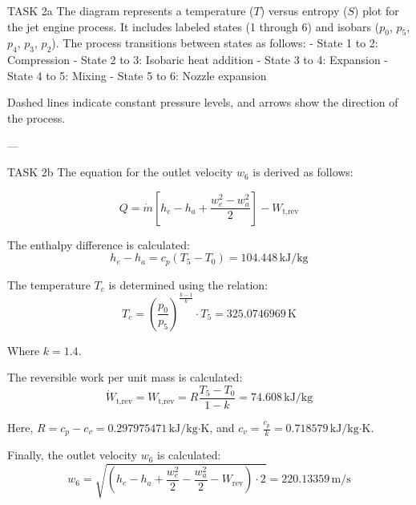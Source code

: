 TASK 2a  
The diagram represents a temperature (\(T\)) versus entropy (\(S\)) plot for the jet engine process. It includes labeled states (1 through 6) and isobars (\(p_0\), \(p_5\), \(p_4\), \(p_3\), \(p_2\)). The process transitions between states as follows:  
- State 1 to 2: Compression  
- State 2 to 3: Isobaric heat addition  
- State 3 to 4: Expansion  
- State 4 to 5: Mixing  
- State 5 to 6: Nozzle expansion  

Dashed lines indicate constant pressure levels, and arrows show the direction of the process.  

---

TASK 2b  
The equation for the outlet velocity \(w_6\) is derived as follows:  

\[
Q = \dot{m} \left[ h_e - h_a + \frac{w_e^2 - w_a^2}{2} \right] - W_{\text{t,rev}}
\]

The enthalpy difference is calculated:  
\[
h_e - h_a = c_p (T_5 - T_0) = 104.448 \, \text{kJ/kg}
\]

The temperature \(T_c\) is determined using the relation:  
\[
T_c = \left( \frac{p_0}{p_5} \right)^{\frac{k-1}{k}} \cdot T_5 = 325.0746969 \, \text{K}
\]

Where \(k = 1.4\).  

The reversible work per unit mass is calculated:  
\[
\dot{W}_{\text{t,rev}} = W_{\text{t,rev}} = R \frac{T_5 - T_0}{1 - k} = 74.608 \, \text{kJ/kg}
\]

Here, \(R = c_p - c_v = 0.297975471 \, \text{kJ/kg·K}\), and \(c_v = \frac{c_p}{k} = 0.718579 \, \text{kJ/kg·K}\).  

Finally, the outlet velocity \(w_6\) is calculated:  
\[
w_6 = \sqrt{ \left( h_e - h_a + \frac{w_e^2}{2} - \frac{w_a^2}{2} - W_{\text{rev}} \right) \cdot 2 } = 220.13359 \, \text{m/s}
\]